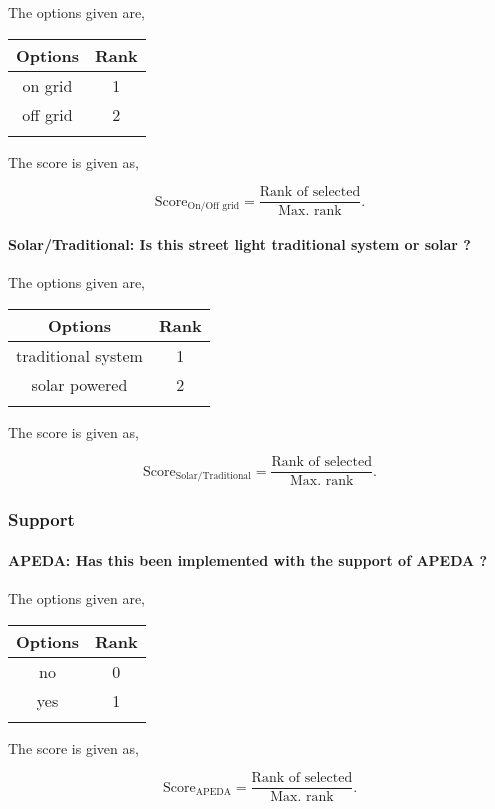 \documentclass[oneside,twocolumn]{article}
\newcommand{\tsub}[2]{\text{#1}_{\text{#2}}}
\newcommand{\dsub}[2]{\dfrac{\text{#1}}{\text{#2}}}
\newcommand{\singsel}[1]
{
	\[
		\tsub{Score}{#1} = \dsub{Rank of selected}{Max. rank}.
	\]
}
\newenvironment{ttable}
{
\begin{center}
\begin{tabular}{c|c}
\hline
}
{
\\ \hline
\end{tabular}
\end{center}
}
\begin{document}
The options given are,
\begin{ttable}
Options & Rank \\ \hline
on grid & 1 \\
off grid & 2 \\
\hline
\end{ttable}
The score is given as,
\singsel{On/Off grid}
\paragraph{Solar/Traditional: Is this street light traditional system or solar ?}

The options given are,
\begin{ttable}
Options & Rank \\ \hline
traditional system & 1 \\
solar powered & 2 \\
\hline
\end{ttable}
The score is given as,
\singsel{Solar/Traditional}
\subsubsection{Support}

\paragraph{APEDA: Has this been implemented with the support of APEDA  ?}

The options given are,
\begin{ttable}
Options & Rank \\ \hline
no & 0 \\
yes & 1 \\
\hline
\end{ttable}
The score is given as,
\singsel{APEDA}
\end{document}
